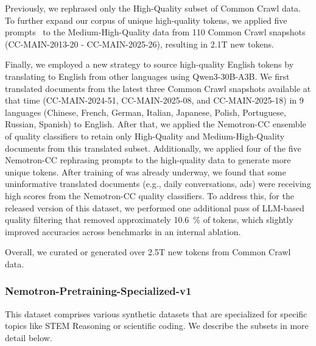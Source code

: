 Previously, we rephrased only the High-Quality subset of Common Crawl data.
To further expand our corpus of unique high-quality tokens, we applied five prompts~\citep{su2024nemotroncctransformingcommoncrawl} to the Medium-High-Quality data from 110 Common Crawl snapshots (CC-MAIN-2013-20 - CC-MAIN-2025-26), resulting in 2.1T new tokens.

Finally, we employed a new strategy to source high-quality English tokens by translating to English from other languages using Qwen3-30B-A3B. %
We first translated documents from the latest three Common Crawl snapshots available at that time (CC-MAIN-2024-51, CC-MAIN-2025-08, and CC-MAIN-2025-18) in 9 languages (Chinese, French, German, Italian, Japanese, Polish, Portuguese, Russian, Spanish) to English.
After that, we applied the Nemotron-CC ensemble of quality classifiers to retain only High-Quality and Medium-High-Quality documents from this translated subset.
Additionally, we applied four of the five Nemotron-CC rephrasing prompts to the high-quality data to generate more unique tokens.
After training of \ourbasemodel was already underway, we found that some uninformative translated documents (e.g., daily conversations, ads) were receiving high scores from the Nemotron-CC quality classifiers.
To address this, for the released version of this dataset, we performed one additional pass of LLM-based quality filtering that removed approximately 10.6~\% of tokens, which slightly improved accuracies across benchmarks in an internal ablation.

Overall, we curated or generated over 2.5T new tokens from Common Crawl data.

\subsubsection{Nemotron-Pretraining-Specialized-v1}

This dataset comprises various synthetic datasets that are specialized for specific topics like STEM Reasoning or scientific coding. We describe the subsets in more detail below.

